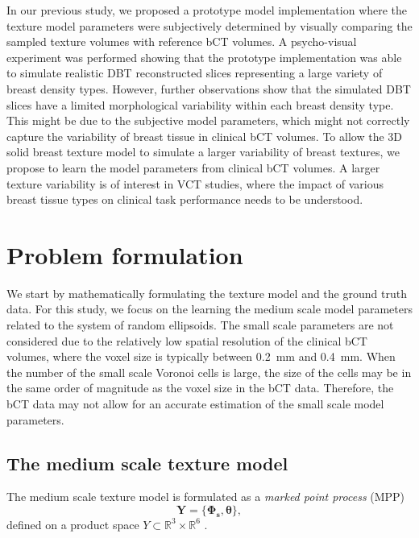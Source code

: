 \documentclass[journal]{IEEEtran}
\begin{document}
In our previous study, we proposed a prototype model implementation
where the texture model parameters were subjectively determined by
visually comparing the sampled texture volumes with reference bCT
volumes. A psycho-visual experiment was performed showing that the
prototype implementation was able to simulate realistic DBT
reconstructed slices representing a large variety of breast density
types. However, further observations show that the simulated DBT
slices have a limited morphological variability within each breast
density type. This might be due to the subjective model parameters,
which might not correctly capture the variability of breast tissue in
clinical bCT volumes. To allow the 3D solid breast texture model to
simulate a larger variability of breast textures, we propose to learn
the model parameters from clinical bCT volumes. A larger texture
variability is of interest in VCT studies, where the impact of various
breast tissue types on clinical task performance needs to be
understood.

\section{Problem formulation}
\label{sec:problem-formulation}

We start by mathematically formulating the texture model and the
ground truth data. For this study, we focus on the learning the
medium scale model parameters related to the system of random
ellipsoids. The small scale parameters are not considered due to the
relatively low spatial resolution of the clinical bCT volumes, where
the voxel size is typically between \SI{0.2}{\mm} and
\SI{0.4}{\mm}. When the number of the small scale Voronoi cells is
large, the size of the cells may be in the same order of magnitude as
the voxel size in the bCT data. Therefore, the bCT data may not allow
for an accurate estimation of the small scale model parameters.

\subsection{The medium scale texture model}
\label{sec:medium-scale-texture}

The medium scale texture model is formulated as a \textit{marked point
  process} (MPP)
$$
\mathbf{Y} = \{ \mathbf{\Phi_{s}},\boldsymbol{\theta} \},
$$
defined on a product space
$Y \subset \mathbb{R}^{3} \times \mathbb{R}^6$
\cite{chiu2013stochastic}.
\end{document}
